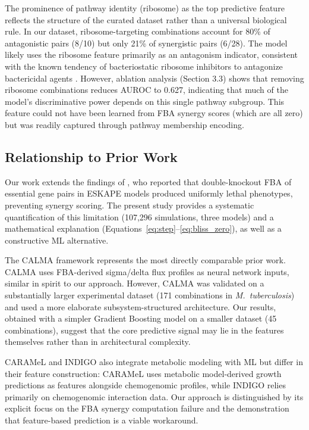 \documentclass[12pt,a4paper]{article}
\begin{document}
The prominence of pathway identity (ribosome) as the top predictive feature reflects the structure of the curated dataset rather than a universal biological rule. In our dataset, ribosome-targeting combinations account for 80\% of antagonistic pairs (8/10) but only 21\% of synergistic pairs (6/28). The model likely uses the ribosome feature primarily as an antagonism indicator, consistent with the known tendency of bacteriostatic ribosome inhibitors to antagonize bactericidal agents \citep{bollenbach2009}. However, ablation analysis (Section 3.3) shows that removing ribosome combinations reduces AUROC to 0.627, indicating that much of the model's discriminative power depends on this single pathway subgroup. This feature could not have been learned from FBA synergy scores (which are all zero) but was readily captured through pathway membership encoding.

\subsection{Relationship to Prior Work}

Our work extends the findings of \citet{kang2026}, who reported that double-knockout FBA of essential gene pairs in ESKAPE models produced uniformly lethal phenotypes, preventing synergy scoring. The present study provides a systematic quantification of this limitation (107,296 simulations, three models) and a mathematical explanation (Equations~\ref{eq:step}--\ref{eq:bliss_zero}), as well as a constructive ML alternative.

The CALMA framework \citep{arora2026} represents the most directly comparable prior work. CALMA uses FBA-derived sigma/delta flux profiles as neural network inputs, similar in spirit to our approach. However, CALMA was validated on a substantially larger experimental dataset (171 combinations in \textit{M.\ tuberculosis}) and used a more elaborate subsystem-structured architecture. Our results, obtained with a simpler Gradient Boosting model on a smaller dataset (45 combinations), suggest that the core predictive signal may lie in the features themselves rather than in architectural complexity.

CARAMeL \citep{ji2023} and INDIGO \citep{chandrasekaran2016} also integrate metabolic modeling with ML but differ in their feature construction: CARAMeL uses metabolic model-derived growth predictions as features alongside chemogenomic profiles, while INDIGO relies primarily on chemogenomic interaction data. Our approach is distinguished by its explicit focus on the FBA synergy computation failure and the demonstration that feature-based prediction is a viable workaround.
\end{document}
